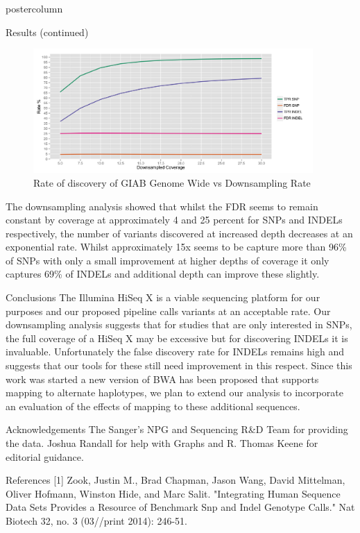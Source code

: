 \documentclass[final]{beamer}
\begin{document}
\begin{frame}{}
\begin{columns}
\begin{column}{.49\textwidth}
\begin{beamercolorbox}[center,wd=\textwidth]{postercolumn}
\begin{minipage}[T]{.95\textwidth}
\begin{block}{Results (continued)}
                \begin{figure}
                \includegraphics[width=0.95\textwidth]{images/downsampling_fig1}
                \caption{Rate of discovery of GIAB Genome Wide vs Downsampling Rate}
                \end{figure}

                The downsampling analysis showed that whilst the FDR seems to remain constant by coverage at approximately 4 and 25 percent for SNPs and INDELs respectively, the number of variants discovered at increased depth decreases at an exponential rate.  Whilst approximately 15x seems to be capture more than 96\% of SNPs with only a small improvement at higher depths of coverage it only captures 69\% of INDELs and additional depth can improve these slightly.

            \end{block}
            \begin{block}{Conclusions}
                The Illumina HiSeq X is a viable sequencing platform for our purposes and our proposed pipeline calls variants at an acceptable rate.  Our downsampling analysis suggests that for studies that are only interested in SNPs, the full coverage of a HiSeq X may be excessive but for discovering INDELs it is invaluable. Unfortunately the false discovery rate for INDELs remains high and suggests that our tools for these still need improvement in this respect. Since this work was started a new version of BWA has been proposed that supports mapping to alternate haplotypes, we plan to extend our analysis to incorporate an evaluation of the effects of mapping to these additional sequences.
            \end{block}
            \begin{block}{Acknowledgements}
                The Sanger's NPG and Sequencing R\&D Team for providing the data. Joshua Randall for help with Graphs and R. Thomas Keene for editorial guidance.
            \end{block}
            \begin{block}{References}
                [1] Zook, Justin M., Brad Chapman, Jason Wang, David Mittelman, Oliver Hofmann, Winston Hide, and Marc Salit. "Integrating Human Sequence Data Sets Provides a Resource of Benchmark Snp and Indel Genotype Calls." Nat Biotech 32, no. 3 (03//print 2014): 246-51.
            \end{block}
            \vfill


\end{minipage}
\end{beamercolorbox}
\end{column}
\end{columns}
\end{frame}
\end{document}
